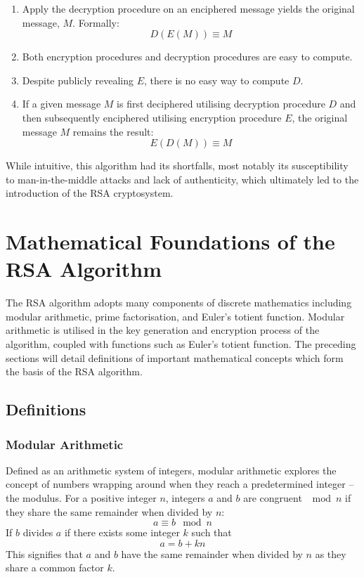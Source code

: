\documentclass{article}
\begin{document}
\begin{enumerate}
    \item Apply the decryption procedure on an enciphered message yields the original message, $M$. Formally:
\begin{equation}
    D(E(M)) \equiv M
\end{equation}
    \item Both encryption procedures and decryption procedures are easy to compute.
    \item Despite publicly revealing $E$, there is no easy way to compute $D$.
    \item If a given message $M$ is first deciphered utilising decryption procedure $D$ and then subsequently enciphered utilising encryption procedure $E$, the original message $M$ remains the result: 
\begin{equation}
        E(D(M)) \equiv M
\end{equation}
\end{enumerate}
While intuitive, this algorithm had its shortfalls, most notably its susceptibility to man-in-the-middle attacks and lack of authenticity, which ultimately led to the introduction of the RSA cryptosystem.

\section{Mathematical Foundations of the RSA Algorithm}
The RSA algorithm adopts many components of discrete mathematics including modular arithmetic, prime factorisation, and Euler's totient function. Modular arithmetic is utilised in the key generation and encryption process of the algorithm, coupled with functions such as Euler's totient function. The preceding sections will detail definitions of important mathematical concepts which form the basis of the RSA algorithm.

\subsection{Definitions}
\subsubsection{Modular Arithmetic}
Defined as an arithmetic system of integers, modular arithmetic explores the concept of numbers wrapping around when they reach a predetermined integer –the modulus. For a positive integer $n$, integers $a$ and $b$ are congruent $\mod n$ if they share the same remainder when divided by $n$:
\begin{equation}
a \equiv b \mod n
\end{equation}
If $b$ divides $a$ if there exists some integer $k$ such that 
\begin{equation}
a = b + kn
\end{equation}
This signifies that $a$ and $b$ have the same remainder when divided by $n$ as they share a common factor $k$. 
\end{document}
